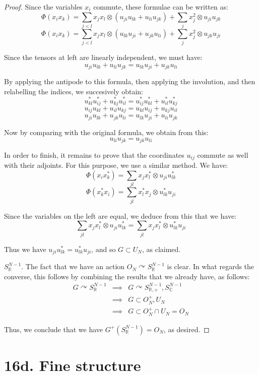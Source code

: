 \documentclass[12pt]{amsbook}
\begin{document}
\begin{proof}
Since the variables $x_i$ commute, these formulae can be written as:
$$\Phi(x_ix_k)=\sum_{j<l}x_jx_l\otimes(u_{ji}u_{lk}+u_{li}u_{jk})+\sum_jx_j^2\otimes u_{ji}u_{jk}$$
$$\Phi(x_ix_k)=\sum_{j<l}x_jx_l\otimes(u_{lk}u_{ji}+u_{jk}u_{li})+\sum_jx_j^2\otimes u_{jk}u_{ji}$$

Since the tensors at left are linearly independent, we must have:
$$u_{ji}u_{lk}+u_{li}u_{jk}=u_{lk}u_{ji}+u_{jk}u_{li}$$

By applying the antipode to this formula, then applying the involution, and then relabelling the indices, we succesively obtain:
$$u_{kl}^*u_{ij}^*+u_{kj}^*u_{il}^*=u_{ij}^*u_{kl}^*+u_{il}^*u_{kj}^*$$
$$u_{ij}u_{kl}+u_{il}u_{kj}=u_{kl}u_{ij}+u_{kj}u_{il}$$
$$u_{ji}u_{lk}+u_{jk}u_{li}=u_{lk}u_{ji}+u_{li}u_{jk}$$

Now by comparing with the original formula, we obtain from this:
$$u_{li}u_{jk}=u_{jk}u_{li}$$

In order to finish, it remains to prove that the coordinates $u_{ij}$ commute as well with their adjoints. For this purpose, we use a similar method. We have:
$$\Phi(x_ix_k^*)=\sum_{jl}x_jx_l^*\otimes u_{ji}u_{lk}^*$$
$$\Phi(x_k^*x_i)=\sum_{jl}x_l^*x_j\otimes u_{lk}^*u_{ji}$$

Since the variables on the left are equal, we deduce from this that we have:
$$\sum_{jl}x_jx_l^*\otimes u_{ji}u_{lk}^*=\sum_{jl}x_jx_l^*\otimes u_{lk}^*u_{ji}$$

Thus we have $u_{ji}u_{lk}^*=u_{lk}^*u_{ji}$, and so $G\subset U_N$, as claimed.

\medskip

\underline{$S^{N-1}_\mathbb R$}. The fact that we have an action $O_N\curvearrowright S^{N-1}_\mathbb R$ is clear. In what regards the converse, this follows by combining the results that we already have, as follows:
\begin{eqnarray*}
G\curvearrowright S^{N-1}_\mathbb R
&\implies&G\curvearrowright S^{N-1}_{\mathbb R,+},S^{N-1}_\mathbb C\\
&\implies&G\subset O_N^+,U_N\\
&\implies&G\subset O_N^+\cap U_N=O_N 
\end{eqnarray*}

Thus, we conclude that we have $G^+(S^{N-1}_\mathbb R)=O_N$, as desired.
\end{proof}

\section*{16d. Fine structure}
\end{document}
